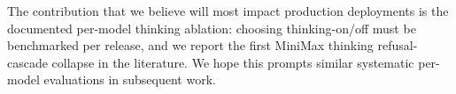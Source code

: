 \documentclass[11pt,letterpaper]{article}
\begin{document}
The contribution that we believe will most impact production deployments
is the documented per-model thinking ablation: choosing thinking-on/off
must be benchmarked per release, and we report the first MiniMax
thinking refusal-cascade collapse in the literature. We hope this prompts
similar systematic per-model evaluations in subsequent work.

\appendix






\end{document}
